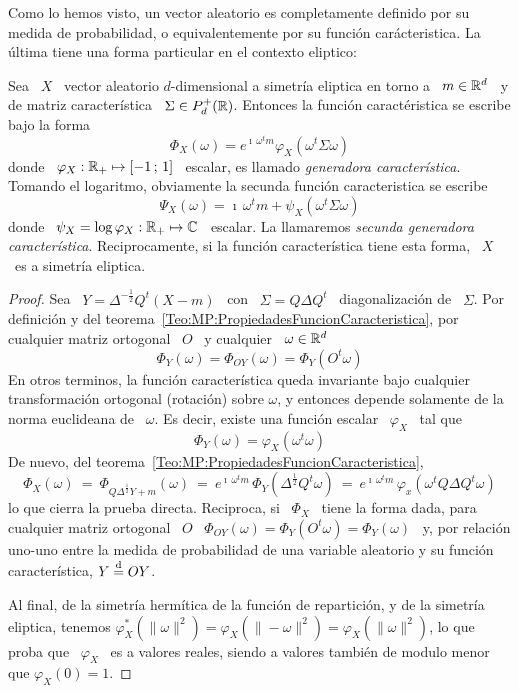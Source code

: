 Como lo hemos visto, un vector aleatorio es completamente definido por su medida
de  probabilidad,  o  equivalentemente  por su  funci\'on  car\'acteristica.  La
\'ultima tiene una forma particular en el contexto eliptico:
%
\begin{teorema}\label{Teo:MP:GeneradorasCaracteristicas}
%
  Sea \ $X$ \ vector aleatorio $d$-dimensional a simetr\'ia eliptica en torno a
  \   $m  \in  \mathbb{R}^d$   \  y   de  matriz   caracter\'istica  \   $\Sigma  \in
  P_d^+(\mathbb{R})$. Entonces la funci\'on caract\'eristica se escribe bajo la forma
  \[
  \Phi_X(\omega)  = e^{\imath  \,  \omega^t m}  \varphi_X\left( \omega^t  \Sigma
    \omega \right)
  \]
  donde  \  $\varphi_X:  \mathbb{R}_+  \mapsto  [-1 \, ; \, 1]$ \  escalar,  es  llamado  {\em
    generadora  caracter\'istica}. Tomando el  logaritmo, obviamente  la secunda
  funci\'on caracteristica se escribe
  \[
  \Psi_X(\omega) =  \imath \, \omega^t  m + \psi_X\left( \omega^t  \Sigma \omega
  \right)
  \]
  donde  \ $\psi_X  =  \log \varphi_X:  \mathbb{R}_+  \mapsto \mathbb{C}$  \ escalar.   La
  llamaremos  {\em secunda generadora  caracter\'istica}. Reciprocamente,  si la
  funci\'on caracter\'istica tiene esta forma, \ $X$ \ es a simetr\'ia eliptica.
\end{teorema}
%
\begin{proof}
  Sea \  $Y = \Delta^{-\frac12} Q^t  \left( X - m  \right)$ \ con \  $\Sigma = Q
  \Delta  Q^t$  \ diagonalizaci\'on  de  \  $\Sigma$.   Por definici\'on  y  del
  teorema~\ref{Teo:MP:PropiedadesFuncionCaracteristica},  por  cualquier  matriz
  ortogonal \ $O$ \ y cualquier \ $\omega \in \mathbb{R}^d$
  \[
  \Phi_Y(\omega) = \Phi_{O Y}(\omega) = \Phi_Y(O^t \omega)
  \]
  En  otros  terminos,  la  funci\'on  caracter\'istica  queda  invariante  bajo
  cualquier transformaci\'on  ortogonal (rotaci\'on) sobre  $\omega$, y entonces
  depende solamente de  la norma euclideana de \ $\omega$.  Es decir, existe una
  funci\'on escalar \ $\varphi_X$ \ tal que
  \[
  \Phi_Y(\omega) = \varphi_X(\omega^t \omega)
  \]
  De nuevo, del teorema~\ref{Teo:MP:PropiedadesFuncionCaracteristica},
  \[
  \Phi_X(\omega)  \:  = \:  \Phi_{Q  \Delta^{\frac12} Y  +  m}(\omega)  \: =  \:
  e^{\imath  \, \omega^t  m} \,  \Phi_Y( \Delta^{\frac12}  Q^t \omega)  \:  = \:
  e^{\imath \, \omega^t m} \, \varphi_x( \omega^t Q \Delta Q^t \omega)
  \]
  lo que  cierra la prueba  directa. Reciproca, si  \ $\Phi_X$ \ tiene  la forma
  dada, para  cualquier matriz ortogonal \  $O$ \ $\Phi_{O  Y}(\omega) = \Phi_Y(
  O^t \omega ) = \Phi_Y(\omega)$ \  y, por relaci\'on uno-uno entre la medida de
  probabilidad  de una variable  aleatorio y  su funci\'on  caracter\'istica, $Y
  \stackrel{\mathrm{d}}{=} O Y$.

  Al final, de la simetr\'ia herm\'itica  de la funci\'on de repartici\'on, y de
  la simetr\'ia  eliptica, tenemos $\varphi_X^*\left(  \| \omega \|^2  \right) =
  \varphi_X\left(  \| -\omega  \|^2  \right) =  \varphi_X\left(  \| \omega  \|^2
  \right)$,  lo que proba  que \  $\varphi_X$ \  es a  valores reales,  siendo a
  valores tambi\'en de modulo menor que $\varphi_X(0) = 1$.
\end{proof}
